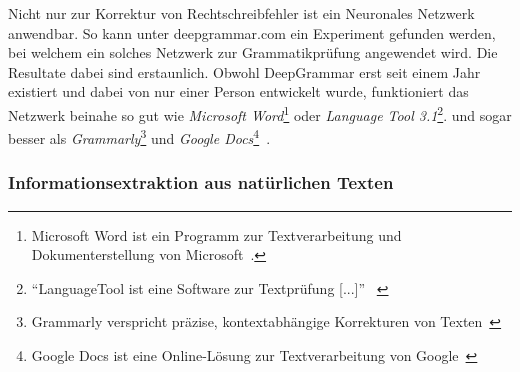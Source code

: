 \documentclass{hwz}
\begin{document}
Nicht nur zur Korrektur von Rechtschreibfehler ist ein Neuronales Netzwerk anwendbar. So kann unter deepgrammar.com ein Experiment gefunden werden, bei welchem ein solches Netzwerk zur Grammatikprüfung angewendet wird. Die Resultate dabei sind erstaunlich. Obwohl DeepGrammar erst seit einem Jahr existiert und dabei von nur einer Person entwickelt wurde, funktioniert das Netzwerk beinahe so gut wie \textit{Microsoft Word}\footnote{Microsoft Word ist ein Programm zur Textverarbeitung und Dokumenterstellung von Microsoft~\autocite{MicrosoftCorporation2018MicrosoftOffice}.} oder \textit{Language Tool 3.1}\footnote{\enquote{LanguageTool ist eine Software zur Textprüfung [...]}~ \autocite{LanguageTool2018LanguageToolGrammatik}}. und sogar besser als \textit{Grammarly}\footnote{Grammarly verspricht präzise, kontextabhängige Korrekturen von Texten~\autocite{GramarlyInc.2018Grammarly:Checker}} und \textit{Google Docs}\footnote{Google Docs ist eine Online-Lösung zur Textverarbeitung von Google~\autocite{GoogleLLC2018GoogleBearbeiten}}~\autocite{MuganEvaluationComparison}.
\begin{figure}
    \centering
\end{figure}



\subsubsection{Informationsextraktion aus natürlichen Texten}
\end{document}
